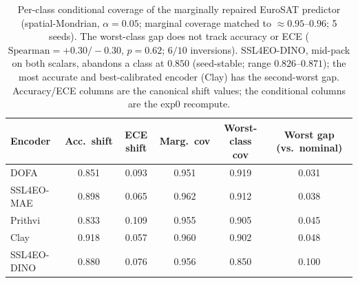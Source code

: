 \documentclass[journal]{IEEEtran}
\renewcommand{\_}{\textunderscore\allowbreak}
\begin{document}
\begin{table}[!t]\centering\small
\caption{Per-class conditional coverage of the marginally repaired EuroSAT predictor
(spatial-Mondrian, $\alpha{=}0.05$; marginal coverage matched to $\approx0.95$--$0.96$; 5 seeds). The
worst-class gap does not track accuracy or ECE ($\mathrm{Spearman}=+0.30/-0.30$, $p{=}0.62$; $6/10$
inversions). SSL4EO-DINO, mid-pack on both scalars, abandons a class at $0.850$ (seed-stable; range $0.826$--$0.871$); the most accurate and
best-calibrated encoder (Clay) has the second-worst gap. Accuracy/ECE columns are the canonical shift
values; the conditional columns are the exp0 recompute.}\label{tab:condcov}
\begin{tabular}{lccccc}
\toprule
Encoder & Acc.\ shift & ECE shift & Marg.\ cov & Worst-class cov & Worst gap (vs.\ nominal) \\
\midrule
DOFA        & 0.851 & 0.093 & 0.951 & 0.919 & 0.031 \\
SSL4EO-MAE  & 0.898 & 0.065 & 0.962 & 0.912 & 0.038 \\
Prithvi     & 0.833 & 0.109 & 0.955 & 0.905 & 0.045 \\
Clay        & 0.918 & 0.057 & 0.960 & 0.902 & 0.048 \\
SSL4EO-DINO & 0.880 & 0.076 & 0.956 & 0.850 & 0.100 \\
\bottomrule
\end{tabular}
\end{table}
\end{document}
